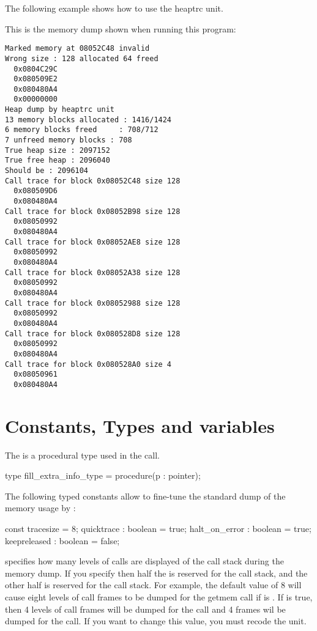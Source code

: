 The following example shows how to use the heaptrc unit.

\html{}

This is the memory dump shown when running this program:
\begin{verbatim}
Marked memory at 08052C48 invalid
Wrong size : 128 allocated 64 freed
  0x0804C29C
  0x080509E2
  0x080480A4
  0x00000000
Heap dump by heaptrc unit
13 memory blocks allocated : 1416/1424
6 memory blocks freed     : 708/712
7 unfreed memory blocks : 708
True heap size : 2097152
True free heap : 2096040
Should be : 2096104
Call trace for block 0x08052C48 size 128
  0x080509D6
  0x080480A4
Call trace for block 0x08052B98 size 128
  0x08050992
  0x080480A4
Call trace for block 0x08052AE8 size 128
  0x08050992
  0x080480A4
Call trace for block 0x08052A38 size 128
  0x08050992
  0x080480A4
Call trace for block 0x08052988 size 128
  0x08050992
  0x080480A4
Call trace for block 0x080528D8 size 128
  0x08050992
  0x080480A4
Call trace for block 0x080528A0 size 4
  0x08050961
  0x080480A4
\end{verbatim}

\section{Constants, Types and variables}

The  is a procedural type used in the
 call.

\begin{listing}
type
    fill_extra_info_type = procedure(p : pointer);
\end{listing}
The following typed constants allow to fine-tune the standard dump of the
memory usage by :

\begin{listing}
const
  tracesize = 8;
  quicktrace : boolean = true;
  halt_on_error : boolean = true;
  keepreleased : boolean = false;
\end{listing}

 specifies how many levels of calls are displayed of the 
call stack during the memory dump. If you specify 
then half the  is reserved for the  call stack, 
and the other half is reserved for the  call stack.
For example, the default value of 8 will cause eight levels of call frames
to be dumped for the getmem call if  is . If
 is true, then 4 levels of call frames will be dumped for
the  call and 4 frames wil be dumped for the  call.
If you want to change this value, you must recode the  unit.

